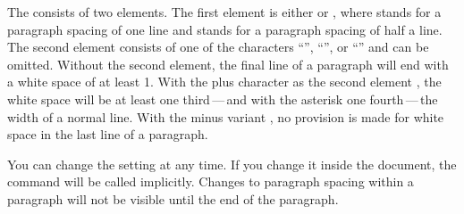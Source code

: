 \begin{Declaration}
\end{Declaration}
The  consists of two elements. The first element is either
 or , where  stands
for a paragraph spacing of one line and  stands for a paragraph
spacing of half a line. The second element consists of one of the characters
``\PValue{*}'', ``\PValue{+}'', or ``\PValue{-}'' and can be omitted. Without
the second element, the final line
of a paragraph will end with a white space of at least 1. With the
plus character as the second element%
, the white space will be
at least one third\,---\,and with the
asterisk one
fourth\,---\,the width of a normal line. With the minus variant%
, no provision is made for
white space in the last line of a paragraph.

You can change the setting at any time. If you change it inside the document,
the %
command will be called implicitly. Changes to paragraph spacing within a 
paragraph will not be visible until the end of the paragraph.

